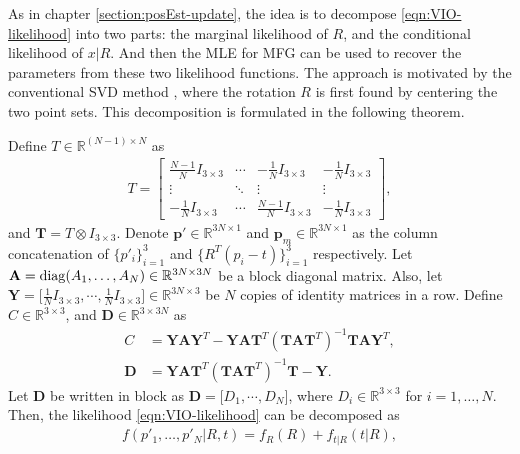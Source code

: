 As in chapter \ref{section:posEst-update}, the idea is to decompose \eqref{eqn:VIO-likelihood} into two parts: the marginal likelihood of $R$, and the conditional likelihood of $x|R$.
And then the MLE for MFG can be used to recover the parameters from these two likelihood functions.
The approach is motivated by the conventional SVD method \cite{arun1987least,besl1992method}, where the rotation $R$ is first found by centering the two point sets.
This decomposition is formulated in the following theorem.

\begin{theorem} \label{thm:VIO-factor}
	Define $T\in\mathbb{R}^{(N-1)\times N}$ as
	\begin{align}
		T = \begin{bmatrix} 
			\frac{N-1}{N} I_{3\times 3} & \cdots & -\frac{1}{N} I_{3\times 3} & -\frac{1}{N} I_{3\times 3}
			\\ \vdots & \ddots & \vdots & \vdots
			\\ -\frac{1}{N} I_{3\times 3} & \cdots & \frac{N-1}{N} I_{3\times 3} & -\frac{1}{N} I_{3\times 3} 
		\end{bmatrix},
	\end{align}
	and $\mathbf{T} = T\otimes I_{3\times 3}$.
	Denote $\bm{p}'\in\mathbb{R}^{3N\times 1}$ and $\bm{p}_m\in\mathbb{R}^{3N\times 1}$ as the column concatenation of $\{p'_i\}_{i=1}^3$ and $\{R^T(p_i-t)\}_{i=1}^3$ respectively.
	Let $\mathbf{A} = \mathrm{diag}(A_1,\ldots,A_N) \in \mathbb{R}^{3N\times 3N}$ be a block diagonal matrix.
	Also, let $\mathbf{Y} = \Big[ \tfrac{1}{N}I_{3\times 3}, \cdots, \tfrac{1}{N}I_{3\times 3} \Big] \in \mathbb{R}^{3N\times 3}$ be $N$ copies of identity matrices in a row.
	Define $C\in\mathbb{R}^{3\times 3}$, and $\mathbf{D}\in\mathbb{R}^{3\times 3N}$ as
	\begin{align}
		C &= \mathbf{Y}\mathbf{A}\mathbf{Y}^T - \mathbf{Y}\mathbf{A}\mathbf{T}^T (\mathbf{T}\mathbf{A}\mathbf{T}^T)^{-1} \mathbf{T}\mathbf{A}\mathbf{Y}^T, \label{eqn:VIO-likelihood-C} \\
		\mathbf{D} &= \mathbf{Y}\mathbf{A}\mathbf{T}^T (\mathbf{T}\mathbf{A}\mathbf{T}^T)^{-1} \mathbf{T} - \mathbf{Y}. \label{eqn:VIO-likelihood-D}
	\end{align}
	Let $\mathbf{D}$ be written in block as $\mathbf{D} = \big[D_1, \cdots, D_N\big]$, where $D_i\in\mathbb{R}^{3\times 3}$ for $i=1,\ldots,N$.
	Then, the likelihood \eqref{eqn:VIO-likelihood} can be decomposed as
	\begin{align}
		f(p'_1,\ldots,p'_N | R,t) = f_R(R) + f_{t|R}(t|R),
	\end{align}

\end{theorem}

